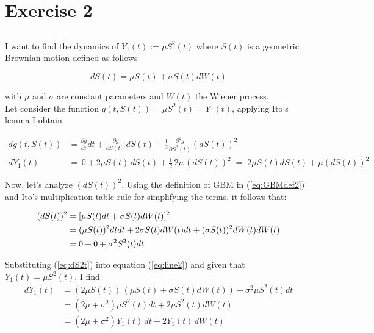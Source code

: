 \section{Exercise 2}

\subsection{}

I want to find the dynamics of $Y_1(t) := \mu S^2(t)$ where $S(t)$ is a geometric Brownian motion defined as follows

\begin{equation}
    dS(t) =  \mu S(t) + \sigma S(t)dW(t) \label{eq:GBMdef2}
\end{equation}

with $\mu$ and $\sigma$ are constant parameters and $W(t)$ the Wiener process. \\ 

Let consider the function $g(t,S(t)) = \mu S^2(t) = Y_1(t)$, applying Ito's lemma I obtain

\begin{align}
    dg(t,S(t)) &= \frac{\partial g}{\partial t} dt +
                    \frac{\partial g}{\partial S(t)} dS(t) +
                    \frac{1}{2} \frac{\partial^2g}{\partial S^2(t)} (dS(t))^2\label{eq:itoformula}\\
    dY_1(t) &= \, 0 + 2\mu S(t)\,dS(t) + \frac{1}{2}\,2\mu\,(dS(t))^2 \;=\; 2\mu S(t) dS(t) + \mu (dS(t))^2 \label{eq:line2}
\end{align}

Now, let's analyze $(dS(t))^2$. Using the definition of GBM in (\ref{eq:GBMdef2}) and Ito's multiplication table rule for simplifying the terms, it follows that:

\begin{align}
    (dS(t))^2 &= [\mu S(t)dt + \sigma S(t)dW(t)]^2 \notag\\
              &= (\mu S(t))^2 dtdt + 2\sigma S(t) dW(t) dt + (\sigma S(t))^2 dW(t)dW(t) \notag \\
              &= 0 + 0 + \sigma^2 S^2(t) dt \label{eq:dS2t} 
\end{align}

Substituting (\ref{eq:dS2t}) into equation (\ref{eq:line2}) and given that $Y_1(t)=\mu S^2(t)$, I find
\begin{align*}
d Y_1(t) &= (2\mu S(t))\,(\mu S(t) + \sigma S(t)dW(t))+ \sigma^2 \mu S^2(t) dt \\
         &= (2\mu+\sigma^2) \mu S^2(t)dt + 2\mu S^2(t) dW(t) \\
         &= (2\mu+\sigma^2) Y_1(t)\,dt + 2Y_1(t) \,dW(t)
\end{align*}

